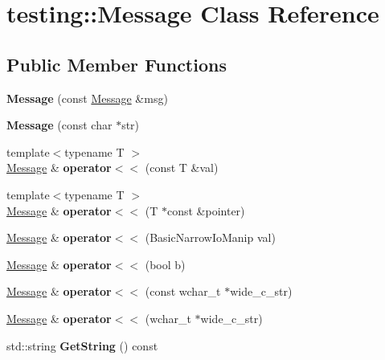 \hypertarget{classtesting_1_1Message}{}\section{testing\+:\+:Message Class Reference}
\label{classtesting_1_1Message}
\subsection*{Public Member Functions}
\begin{DoxyCompactItemize}
\item 
\mbox{\label{classtesting_1_1Message_ac126e24804817a053bebba0920d94a11}} 
{\bfseries Message} (const \hyperlink{classtesting_1_1Message}{Message} \&msg)
\item 
\mbox{\label{classtesting_1_1Message_a9de694ca239486809fc99fbbea8ac21d}} 
{\bfseries Message} (const char $\ast$str)
\item 
\mbox{\label{classtesting_1_1Message_a2e0e71be52d54c20a75a55fca812721f}} 
{\footnotesize template$<$typename T $>$ }\\\hyperlink{classtesting_1_1Message}{Message} \& {\bfseries operator$<$$<$} (const T \&val)
\item 
\mbox{\label{classtesting_1_1Message_aa3ab685879958f90d2d8cd5b68d10c34}} 
{\footnotesize template$<$typename T $>$ }\\\hyperlink{classtesting_1_1Message}{Message} \& {\bfseries operator$<$$<$} (T $\ast$const \&pointer)
\item 
\mbox{\label{classtesting_1_1Message_a3a71a1c1c8ea52de5852d75483d41453}} 
\hyperlink{classtesting_1_1Message}{Message} \& {\bfseries operator$<$$<$} (Basic\+Narrow\+Io\+Manip val)
\item 
\mbox{\label{classtesting_1_1Message_a3e1e04f23b1bdfe18adfd59928296346}} 
\hyperlink{classtesting_1_1Message}{Message} \& {\bfseries operator$<$$<$} (bool b)
\item 
\mbox{\label{classtesting_1_1Message_ac0db9c22535b28bc863bfd0a1fdf7e14}} 
\hyperlink{classtesting_1_1Message}{Message} \& {\bfseries operator$<$$<$} (const wchar\+\_\+t $\ast$wide\+\_\+c\+\_\+str)
\item 
\mbox{\label{classtesting_1_1Message_ac1d3a041ac4bb9c929ee746b31a13d6a}} 
\hyperlink{classtesting_1_1Message}{Message} \& {\bfseries operator$<$$<$} (wchar\+\_\+t $\ast$wide\+\_\+c\+\_\+str)
\item 
\mbox{\label{classtesting_1_1Message_a2cdc4df62bdcc9df37651a1cf527704e}} 
std\+::string {\bfseries Get\+String} () const
\end{DoxyCompactItemize}


